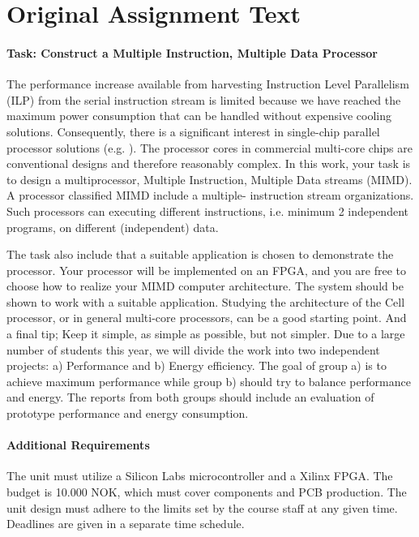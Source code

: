 
\section{Original Assignment Text}\label{intro:original-text}

\paragraph{Task: Construct a Multiple Instruction, Multiple Data Processor}
The performance increase available from harvesting Instruction Level Parallelism
(ILP) from the serial instruction stream is limited because we have reached the
maximum power consumption that can be handled without expensive cooling
solutions\cite{olukotun}. Consequently, there is a significant interest in
single-chip parallel processor solutions (e.g. \cite{bell,kongetira}). The
processor cores in commercial multi-core chips are conventional designs and
therefore reasonably complex. In this work, your task is to design a
multiprocessor, Multiple Instruction, Multiple Data streams (MIMD). A processor
classified MIMD include a multiple- instruction stream
organizations\cite{flynn}. Such processors can executing different instructions,
i.e. minimum 2 independent programs, on different (independent) data.

The task also include that a suitable application is chosen to demonstrate the
processor. Your processor will be implemented on an FPGA, and you are free to
choose how to realize your MIMD computer architecture. The system should be
shown to work with a suitable application. Studying the architecture of the
Cell processor\cite{wiki_cell_mpu}, or in general multi-core
processors\cite{wiki_multicore}, can be a good starting point. And a final tip;
Keep it simple, as simple as possible, but not simpler. Due to a large number of
students this year, we will divide the work into two independent projects: a)
Performance and b) Energy efficiency. The goal of group a) is to achieve maximum
performance while group b) should try to balance performance and energy. The
reports from both groups should include an evaluation of prototype performance
and energy consumption.

\paragraph{Additional Requirements}
The unit must utilize a Silicon Labs microcontroller and a Xilinx FPGA. The
budget is 10.000 NOK, which must cover components and PCB production. The unit
design must adhere to the limits set by the course staff at any given time.
Deadlines are given in a separate time schedule.

